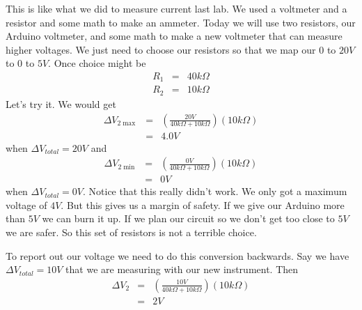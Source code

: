 This is like what we did to measure current last lab. We used a voltmeter
and a resistor and some math to make an ammeter. Today we will use two
resistors, our Arduino voltmeter, and some math to make a new voltmeter that
can measure higher voltages. We just need to choose our resistors so that we
map our $0$ to $20\unit{V}$ to $0$ to $5\unit{V}.$ Once choice might be 
\begin{eqnarray*}
R_{1} &=&40\unit{k%
\Omega%
} \\
R_{2} &=&10\unit{k%
\Omega%
}
\end{eqnarray*}%
Let's try it. We would get%
\begin{eqnarray*}
\Delta V_{2\max } &=&\left( \frac{20\unit{V}}{40\unit{k%
\Omega%
}+10\unit{k%
\Omega%
}}\right) \left( 10\unit{k%
\Omega%
}\right) \\
&=&4.0\unit{V}
\end{eqnarray*}%
when $\Delta V_{total}=20\unit{V}$ and 
\begin{eqnarray*}
\Delta V_{2\min } &=&\left( \frac{0\unit{V}}{40\unit{k%
\Omega%
}+10\unit{k%
\Omega%
}}\right) \left( 10\unit{k%
\Omega%
}\right) \\
&=&0\unit{V}
\end{eqnarray*}%
when $\Delta V_{total}=0\unit{V}.$ Notice that this really didn't work. We
only got a maximum voltage of $4\unit{V}.$ But this gives us a margin of
safety. If we give our Arduino more than $5\unit{V}$ we can burn it up. If
we plan our circuit so we don't get too close to $5\unit{V}$ we are safer. So
this set of resistors is not a terrible choice.

To report out our voltage we need to do this conversion backwards. Say we
have $\Delta V_{total}=10\unit{V}$ that we are measuring with our new
instrument. Then 
\begin{eqnarray*}
\Delta V_{2} &=&\left( \frac{10\unit{V}}{40\unit{k%
\Omega%
}+10\unit{k%
\Omega%
}}\right) \left( 10\unit{k%
\Omega%
}\right) \\
&=&2\unit{V}
\end{eqnarray*}

